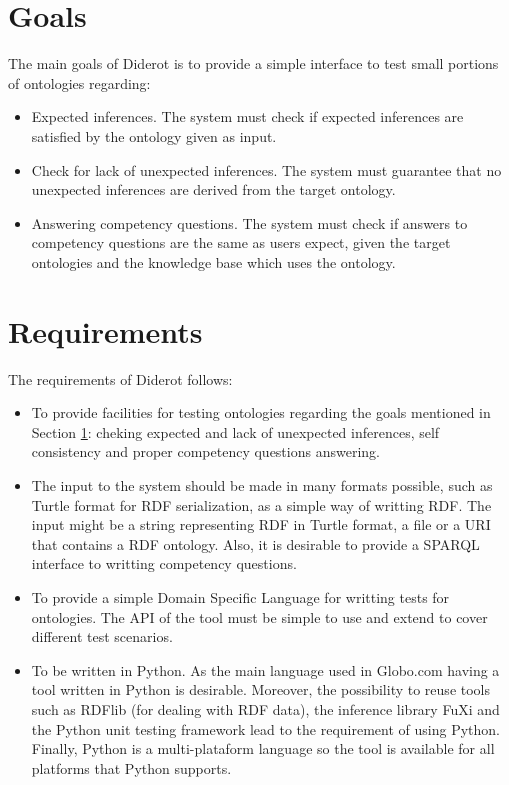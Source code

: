 \documentclass{report}
\begin{document}
\section{Goals}
\label{goals}

The main goals of Diderot is to provide a simple interface to test small portions of ontologies regarding:

\begin{itemize}
    \item Expected inferences. The system must check if expected inferences are satisfied by the ontology
        given as input.
    \item Check for lack of unexpected inferences. The system must guarantee that no unexpected inferences are
        derived from the target ontology.
    \item Answering competency questions. The system must check if answers to competency questions are
        the same as users expect, given the target ontologies and the knowledge base which uses the ontology.
\end{itemize}

\section{Requirements}
\label{requirements}

The requirements of Diderot follows:
\begin{itemize}
    \item To provide facilities for testing ontologies regarding the goals mentioned in Section \ref{goals}: cheking
        expected and lack of unexpected inferences, self consistency and proper competency questions answering.
    \item The input to the system should be made in many formats possible, such as Turtle format for RDF serialization,
        as a simple way of writting RDF. The input might be a string representing RDF in Turtle format, a file or a
        URI that contains a RDF ontology. Also, it is desirable to provide a SPARQL interface to writting competency questions.
    \item To provide a simple Domain Specific Language for writting tests for ontologies. The API of the tool must be simple
        to use and extend to cover different test scenarios.
    \item To be written in Python. As the main language used in Globo.com having a tool written in Python is desirable.
        Moreover, the possibility to reuse tools such as RDFlib (for dealing with RDF data), the inference library FuXi
        and the Python unit testing framework lead to the requirement of using Python.
        Finally, Python is a multi-plataform language so the tool is available for all platforms that Python supports.
\end{itemize}
\end{document}
